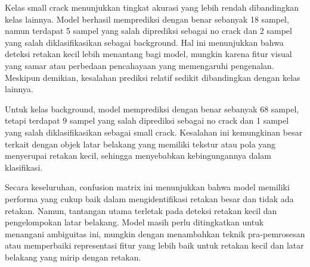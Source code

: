 \documentclass[12pt,a4paper]{article}
\begin{document}
\begin{adjustwidth}{3em}{0pt}
\hspace{0.5cm} Kelas small crack menunjukkan tingkat akurasi yang lebih rendah dibandingkan kelas lainnya. Model berhasil memprediksi dengan benar sebanyak 18 sampel, namun terdapat 5 sampel yang salah diprediksi sebagai no crack dan 2 sampel yang salah diklasifikasikan sebagai background. Hal ini menunjukkan bahwa deteksi retakan kecil lebih menantang bagi model, mungkin karena fitur visual yang samar atau perbedaan pencahayaan yang memengaruhi pengenalan. Meskipun demikian, kesalahan prediksi relatif sedikit dibandingkan dengan kelas lainnya.

\hspace{0.5cm} Untuk kelas background, model memprediksi dengan benar sebanyak 68 sampel, tetapi terdapat 9 sampel yang salah diprediksi sebagai no crack dan 1 sampel yang salah diklasifikasikan sebagai small crack. Kesalahan ini kemungkinan besar terkait dengan objek latar belakang yang memiliki tekstur atau pola yang menyerupai retakan kecil, sehingga menyebabkan kebingungannya dalam klasifikasi.

\hspace{0.5cm} Secara keseluruhan, confusion matrix ini menunjukkan bahwa model memiliki performa yang cukup baik dalam mengidentifikasi retakan besar dan tidak ada retakan. Namun, tantangan utama terletak pada deteksi retakan kecil dan pengelompokan latar belakang. Model masih perlu ditingkatkan untuk menangani ambiguitas ini, mungkin dengan menambahkan teknik pra-pemrosesan atau memperbaiki representasi fitur yang lebih baik untuk retakan kecil dan latar belakang yang mirip dengan retakan.
\end{adjustwidth}
\end{document}
